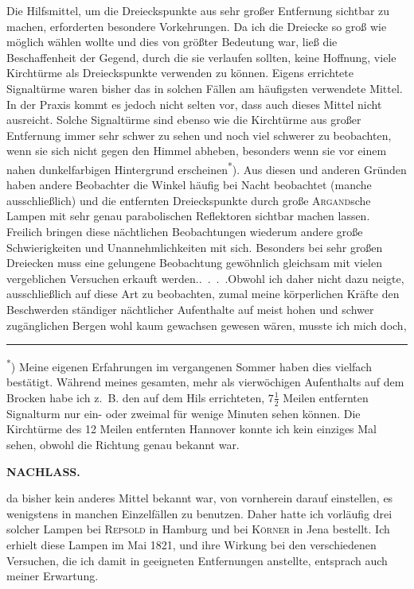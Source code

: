 \par\noindent\hspace*{\parindent}Die Hilfsmittel, um die Dreieckspunkte aus sehr großer Entfernung
sichtbar zu machen, erforderten besondere Vorkehrungen. Da ich die Dreiecke
so groß wie möglich wählen wollte und dies von größter Bedeutung war, ließ
die Beschaffenheit der Gegend, durch die sie verlaufen sollten, keine Hoffnung,
viele Kirchtürme als Dreieckspunkte verwenden zu können. Eigens errichtete
Signaltürme waren bisher das in solchen Fällen am häufigsten verwendete
Mittel. In der Praxis kommt es jedoch nicht selten vor, dass auch dieses Mittel
nicht ausreicht. Solche Signaltürme sind ebenso wie die Kirchtürme aus großer
Entfernung immer sehr schwer zu sehen und noch viel schwerer zu beobachten,
wenn sie sich nicht gegen den Himmel abheben, besonders wenn sie vor einem
nahen dunkelfarbigen Hintergrund erscheinen\textsuperscript{*}). Aus diesen und anderen
Gründen haben andere Beobachter die Winkel häufig bei Nacht beobachtet
(manche ausschließlich) und die entfernten Dreieckspunkte durch große
\textsc{Argand}sche Lampen mit sehr genau parabolischen Reflektoren sichtbar
machen lassen. Freilich bringen diese nächtlichen Beobachtungen wiederum
andere große Schwierigkeiten und Unannehmlichkeiten mit sich. Besonders
bei sehr großen Dreiecken muss eine gelungene Beobachtung gewöhnlich
gleichsam mit vielen vergeblichen Versuchen erkauft \mbox{werden.\enspace\mbox{.\ .\ .\ .}}\quad Obwohl
ich daher nicht dazu neigte, ausschließlich auf diese Art zu beobachten, zumal
meine körperlichen Kräfte den Beschwerden ständiger nächtlicher Aufenthalte
auf meist hohen und schwer zugänglichen Bergen wohl kaum gewachsen
gewesen wären, musste ich mich doch,

\par\smallskip\noindent\rule{.24\linewidth}{.4pt}\par\smallskip
{\footnotesize
\noindent\hspace*{\parindent}\textsuperscript{*}) Meine eigenen Erfahrungen im vergangenen Sommer haben dies vielfach bestätigt.
Während meines gesamten, mehr als vierwöchigen Aufenthalts auf dem Brocken habe ich z.~B. den auf dem Hils
errichteten, \(7\tfrac{1}{2}\) Meilen entfernten Signalturm nur ein- oder zweimal für wenige Minuten sehen können.
Die Kirchtürme des 12 Meilen entfernten Hannover konnte ich kein einziges Mal sehen, obwohl die Richtung genau bekannt war.\par}
\clearpage

\noindent{}\hfill{\small\textbf{NACHLASS.}}\hfill\null\par\medskip
\noindent da bisher kein anderes Mittel bekannt war, von vornherein darauf
einstellen, es wenigstens in manchen Einzelfällen zu benutzen. Daher hatte ich
vorläufig drei solcher Lampen bei \textsc{Repsold} in Hamburg und bei \textsc{Körner} in
Jena bestellt. Ich erhielt diese Lampen im Mai 1821, und ihre Wirkung bei
den verschiedenen Versuchen, die ich damit in geeigneten Entfernungen
anstellte, entsprach auch meiner Erwartung.

